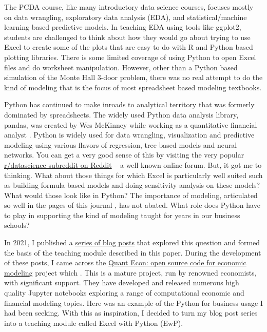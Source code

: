 \documentclass[ited,blindrev]{informs3}              %
\begin{document}
The PCDA course, like many introductory data science courses, focuses mostly on data wrangling, exploratory data analysis (EDA), and statistical/machine learning based predictive models. In teaching EDA using tools like ggplot2, students are challenged to think about how they would go about trying to use Excel to create some of the plots that are easy to do with R and Python based plotting libraries. There is some limited coverage of using Python to open Excel files and do worksheet manipulation. However, other than a Python based simulation of the Monte Hall 3-door problem, there was no real attempt to do the kind of modeling that is the focus of most spreadsheet based modeling textbooks. 

Python has continued to make inroads to analytical territory that was formerly dominated by spreadsheets. The widely used Python data analysis library, pandas, was created by Wes McKinney while working as a quantitative financial analyst \cite{PythonDataAnalysis}. Python is widely used for data wrangling, visualization and predictive modeling using various flavors of regression, tree based models and neural networks. You can get a very good sense of this by visiting the very popular \href{https://www.reddit.com/r/datascience/}{r/datascience subreddit on Reddit} -- a well known online forum. But, it got me to thinking. What about those things for which Excel is particularly well suited such as building formula based models and doing sensitivity analysis on these models? What would those look like in Python? The importance of modeling, articulated so well in the pages of this journal \cite{powellTeachingModelingManagement2001}, has not abated. What role does Python have to play in supporting the kind of modeling taught for years in our business schools?

In 2021, I published a \href{https://bitsofanalytics.org/#category=excel}{series of blog posts} that explored this question and formed the basis of the teaching module described in this paper. During the development of these posts, I came across the \href{https://quantecon.org/}{Quant Econ: open source code for economic modeling} project which . This is a mature project, run by renowned economists, with significant support. They have developed and released numerous high quality Jupyter notebooks exploring a range of computational economic and financial modeling topics. Here was an example of the Python for business usage I had been seeking. With this as inspiration, I decided to turn my blog post series into a teaching module called Excel with Python (EwP). 
\end{document}
